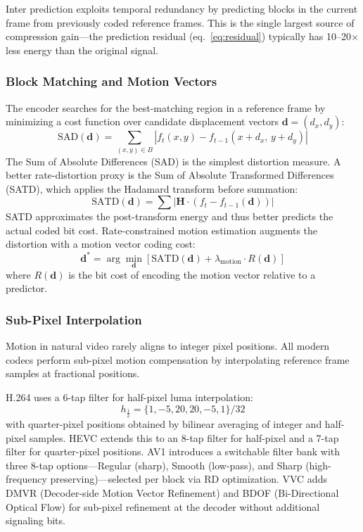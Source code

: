 Inter prediction exploits temporal redundancy by predicting blocks in the
current frame from previously coded reference frames. This is the single
largest source of compression gain---the prediction residual
(eq.~\ref{eq:residual}) typically has 10--20$\times$ less energy than the
original signal.

\subsubsection{Block Matching and Motion Vectors}
\label{sec:block-matching}

The encoder searches for the best-matching region in a reference frame by
minimizing a cost function over candidate displacement vectors
$\mathbf{d} = (d_x, d_y)$:
\begin{equation}
  \text{SAD}(\mathbf{d}) = \sum_{(x,y) \in B}
    \left| f_t(x,y) - f_{t-1}(x + d_x,\, y + d_y) \right|
  \label{eq:sad}
\end{equation}
The Sum of Absolute Differences (SAD) is the simplest distortion measure.
A better rate-distortion proxy is the Sum of Absolute Transformed
Differences (SATD), which applies the Hadamard transform before summation:
\begin{equation}
  \text{SATD}(\mathbf{d}) = \sum \left| \mathbf{H}
    \cdot \left( f_t - f_{t-1}(\mathbf{d}) \right) \right|
  \label{eq:satd}
\end{equation}
SATD approximates the post-transform energy and thus better predicts the
actual coded bit cost. Rate-constrained motion estimation augments the
distortion with a motion vector coding cost:
\begin{equation}
  \mathbf{d}^* = \arg\min_{\mathbf{d}} \left[
    \text{SATD}(\mathbf{d}) + \lambda_{\text{motion}} \cdot R(\mathbf{d})
  \right]
  \label{eq:rcme}
\end{equation}
where $R(\mathbf{d})$ is the bit cost of encoding the motion vector
relative to a predictor.

\subsubsection{Sub-Pixel Interpolation}
\label{sec:subpixel}

Motion in natural video rarely aligns to integer pixel positions. All modern
codecs perform sub-pixel motion compensation by interpolating reference
frame samples at fractional positions.

H.264 uses a 6-tap filter for half-pixel luma interpolation:
\begin{equation}
  h_{\frac{1}{2}} = \{1, -5, 20, 20, -5, 1\} / 32
  \label{eq:h264-halfpel}
\end{equation}
with quarter-pixel positions obtained by bilinear averaging of integer and
half-pixel samples. HEVC extends this to an 8-tap filter for half-pixel and
a 7-tap filter for quarter-pixel positions. AV1 introduces a switchable
filter bank with three 8-tap options---Regular (sharp), Smooth (low-pass),
and Sharp (high-frequency preserving)---selected per block via RD
optimization. VVC adds DMVR (Decoder-side Motion Vector Refinement) and
BDOF (Bi-Directional Optical Flow) for sub-pixel refinement at the decoder
without additional signaling bits.

